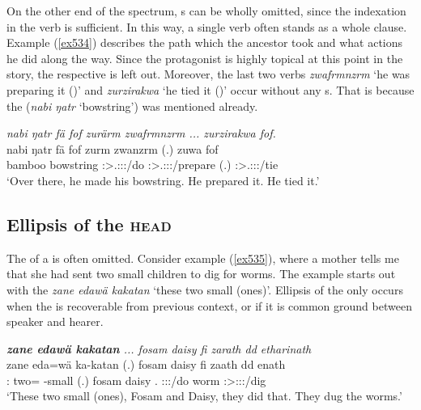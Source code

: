 On the other end of the spectrum, s can be wholly omitted, since the indexation in the verb is sufficient. In this way, a single verb often stands as a whole clause. Example (\ref{ex534}) describes the path which the ancestor took and what actions he did along the way. Since the protagonist is highly topical at this point in the story, the respective  is left out. Moreover, the last two verbs \emph{zwafrmnzrm} `he was preparing it (\F)' and \emph{zurzirakwa} `he tied it (\F)' occur without any s. That is because the   (\emph{nabi ŋatr} `bowstring') was mentioned already.

\begin{exe}
	\ex \emph{nabi ŋatr fä fof zurärm zwafrmnzrm ... zurzirakwa fof.}\\
	\gll nabi ŋatr fä fof zurm zwanzrm (.) zuwa fof\\
	bamboo bowstring {\Dist} {\Emph} \Sg:\Sbj>\Tsg.\F:\Obj:\Pst:\Dur/do \Sg:\Sbj>\Tsg.\F:\Obj:\Pst:\Dur/prepare (.) \Sg:\Sbj>\Tsg.\F:\Obj:\Pst:\Ipfv/tie {\Emph}\\
	\trans `Over there, he made his bowstring. He prepared it. He tied it.'\\
	\label{ex534}
\end{exe}

\subsection{Ellipsis of the \textsc{head}}\label{headellipsis}

The  of a  is often omitted. Consider example (\ref{ex535}), where a mother tells me that she had sent two small children to dig for worms. The example starts out with the  \emph{zane edawä kakatan} `these two small (ones)'. Ellipsis of the  only occurs when the  is recoverable from previous context, or if it is common ground between speaker and hearer.

\begin{exe}
	\ex \emph{\textbf{zane edawä kakatan} ... fosam daisy fi zarath dd etharinath}\\
	\gll zane eda=wä ka-katan (.) fosam daisy fi zaath dd enath\\
	\Dem:{\Prox} two={\Emph} \Redup-small (.) fosam daisy \Third.{\Abs} \Stdu:\Sbj:\Pst:\Pfv/do worm \Stdu:\Sbj>\Stpl:\Obj:\Pst:\Ipfv/dig\\
	\trans `These two small (ones), Fosam and Daisy, they did that. They dug the worms.'\\
	\label{ex535}
\end{exe}

